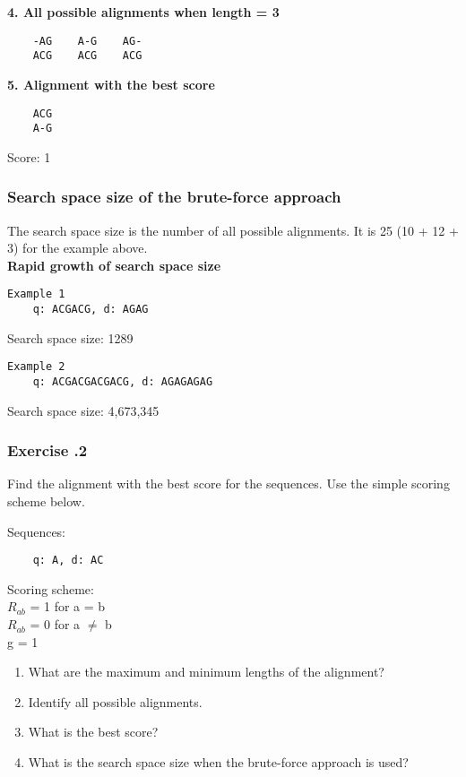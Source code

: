 \noindent \textbf{4. All possible alignments when length = 3}
\begin{verbatim}
    -AG    A-G    AG-
    ACG    ACG    ACG
\end{verbatim}
\medskip

\noindent \textbf{5. Alignment with the best score}
\begin{verbatim}
    ACG
    A-G	
\end{verbatim}

Score: 1

%
%
\subsubsection*{Search space size of the brute-force approach}
The search space size is the number of all possible alignments. It is 25 (10 + 12 + 3) for the example above. \\

\noindent \textbf{Rapid growth of search space size}

\begin{multicols}{2}
\begin{verbatim}
Example 1
    q: ACGACG, d: AGAG
\end{verbatim}
Search space size: 1289

\begin{verbatim}
Example 2
    q: ACGACGACGACG, d: AGAGAGAG
\end{verbatim}
Search space size: 4,673,345

\end{multicols}

%
%
\subsubsection*{Exercise \thesection.2}
Find the alignment with the best score for the sequences.  Use the simple scoring scheme below.

\begin{multicols}{2}
Sequences:
\begin{verbatim}
    q: A, d: AC
\end{verbatim}
\vfill\null
\columnbreak

\noindent Scoring scheme: \\ 
\null \quad $R_{ab}$ = 1 for a = b \\ 
\null \quad $R_{ab}$ = 0 for a $\neq$ b \\ 
\null \quad g = 1

\end{multicols} 

\begin{enumerate}
\item What are the maximum and minimum lengths of the alignment?
\item Identify all possible alignments.
\item What is the best score?
\item What is the search space size when the brute-force approach is used?
\end{enumerate}

%
